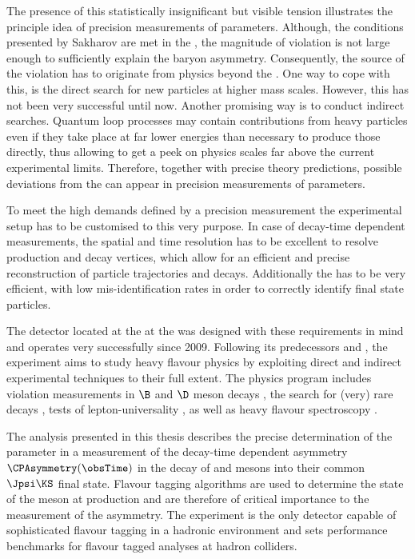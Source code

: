 The presence of this statistically insignificant but visible tension illustrates
the principle idea of precision measurements of \CKM parameters. Although, the
conditions presented by Sakharov are met in the \SM, the magnitude of \CP
violation is not large enough to sufficiently explain the baryon asymmetry.
Consequently, the source of the \CP violation has to originate from physics
beyond the \SM. One way to cope with this, is the direct search for new
particles at higher mass scales. However, this has not been very successful
until now. Another promising way is to conduct indirect searches. Quantum loop
processes may contain contributions from heavy particles even if they take place
at far lower energies than necessary to produce those directly, thus allowing to
get a peek on physics scales far above the current experimental limits.
Therefore, together with precise theory predictions, possible deviations from
the \SM can appear in precision measurements of \SM parameters.

To meet the high demands defined by a precision measurement the experimental
setup has to be customised to this very purpose. In case of decay-time dependent
measurements, the spatial and time resolution has to be excellent to resolve
production and decay vertices, which allow for an efficient and precise
reconstruction of particle trajectories and decays. Additionally the \PID has to
be very efficient, with low mis-identification rates in order to correctly
identify final state particles.

The \LHCb detector located at the \LHC at the \CERN was designed with these
requirements in mind and operates very successfully since 2009. Following its
predecessors \Babar and \Belle, the \LHCb experiment aims to study heavy flavour
physics by exploiting direct and indirect experimental techniques to their full
extent. The physics program includes \CP violation measurements in $\B$ and $\D$
meson decays
\cite{Aaij:2015tza,Aaij:2015yda,Aaij:2014uva,Aaij:2014fba,Aaij:2014dka,Aaij:2014zsa,Aaij:2014kxa}, 
the search for (very) rare decays \cite{CMS:2014xfa}, tests of
lepton-universality \cite{Aaij:2014ora,Aaij:2015yra}, as well as heavy flavour
spectroscopy \cite{Aaij:2014yka,Aaij:2015tga}.

The analysis presented in this thesis describes the precise determination of the
\CKM parameter \sintwobeta in a measurement of the decay-time dependent \CP
asymmetry $\CPAsymmetry(\obsTime)$ in the decay of \Bd and \Bdbar mesons into
their common $\Jpsi\KS$ final state. Flavour tagging algorithms are used to
determine the state of the \B meson at production and are therefore of critical
importance to the measurement of the \CP asymmetry. The \LHCb experiment is the
only detector capable of sophisticated flavour tagging in a hadronic environment
and sets performance benchmarks for flavour tagged \CP analyses at hadron
colliders.

